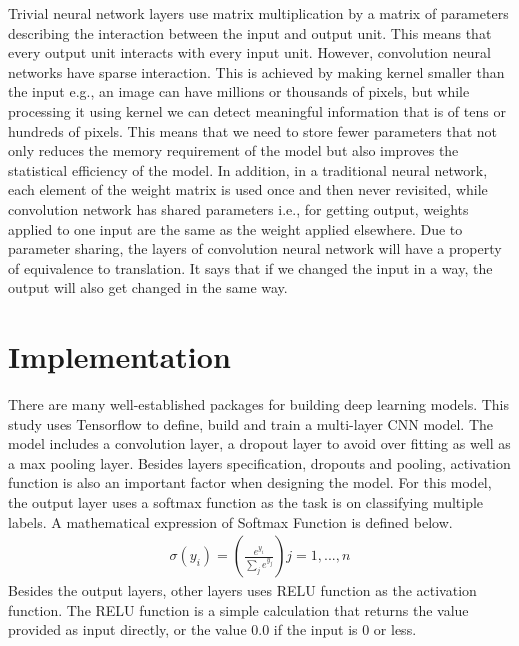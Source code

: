 \documentclass[letterpaper]{article} %
\begin{document}
Trivial neural network layers use matrix multiplication by a matrix of parameters describing the interaction between the input and output unit. This means that every output unit interacts with every input unit. However, convolution neural networks have sparse interaction. This is achieved by making kernel smaller than the input e.g., an image can have millions or thousands of pixels, but while processing it using kernel we can detect meaningful information that is of tens or hundreds of pixels. This means that we need to store fewer parameters that not only reduces the memory requirement of the model but also improves the statistical efficiency of the model. In addition, in a traditional neural network, each element of the weight matrix is used once and then never revisited, while convolution network has shared parameters i.e., for getting output, weights applied to one input are the same as the weight applied elsewhere. Due to parameter sharing, the layers of convolution neural network will have a property of equivalence to translation. It says that if we changed the input in a way, the output will also get changed in the same way.


\section{Implementation}
There are many well-established packages for building deep learning models. This study uses Tensorflow to define, build and train a multi-layer CNN model. The model includes a convolution layer, a dropout layer to avoid over fitting as well as a max pooling layer. Besides layers specification, dropouts and pooling, activation function is also an important factor when designing the model. For this model, the output layer uses a softmax function as the task is on classifying multiple labels. A mathematical expression of Softmax Function is defined below.
\begin{eqnarray}
\sigma(y_{i}) = \left(\frac{e^{y_{i}}}{ \sum\limits_{j} e^{y_{j}}}\right)
j = 1,...,n
\end{eqnarray}
Besides the output layers, other layers uses RELU function as the activation function. The RELU function is a simple calculation that returns the value provided as input directly, or the value 0.0 if the input is 0 or less. \\
\end{document}
